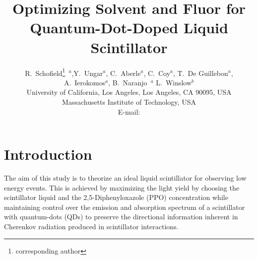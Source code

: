 \documentclass{JINST}
\title{Optimizing Solvent and Fluor for Quantum-Dot-Doped Liquid Scintillator}
\author{R.~Schofield\setcounter{footnote}{0}\thanks{corresponding author}~$^a$,Y.~Ungar$^a$, C.~Aberle$^a$, C.~Coy$^a$, T.~De Guillebon$^a$, A.~Ierokomos$^a$, B.~Naranjo~$^a$ L.~Winslow$^b$\\
\llap{$^a$}University of California, Los Angeles, Los Angeles, CA 90095, USA\\
\llap{$^b$}Massachusetts Institute of Technology, USA\\
E-mail: \email{rschofield@physics.ucla.edu}}
\begin{document}
\section{Introduction}\label{intro}
 The aim of this study is to theorize an ideal liquid scintillator for observing low energy events. This is achieved by maximizing the light yield by choosing the scintillator liquid and the 2,5-Diphenyloxazole (PPO) concentration while maintaining control over the emission and absorption spectrum of a scintillator with quantum-dots (QDs) to preserve the directional information inherent in Cherenkov radiation produced in scintillator interactions.
 


\end{document}
